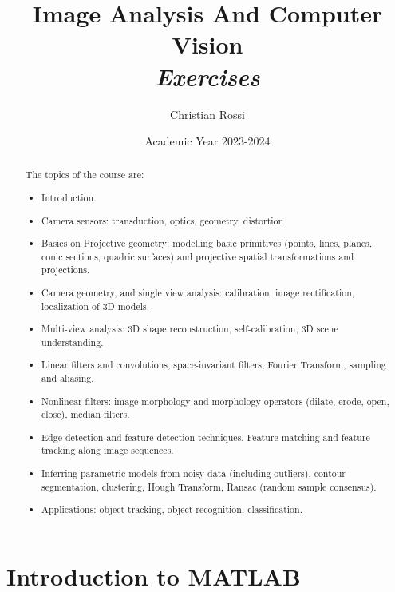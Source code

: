 \documentclass[12pt, a4paper]{report}
\title{Image Analysis And Computer Vision\\ \textit{Exercises}}
\author{Christian Rossi}
\date{Academic Year 2023-2024}
\begin{document}
\maketitle

\newpage

\begin{abstract}
    The topics of the course are: 
    \begin{itemize}
        \item Introduction.
        \item Camera sensors: transduction, optics, geometry, distortion
        \item Basics on Projective geometry: modelling basic primitives (points, lines, planes, conic sections, quadric surfaces) and projective spatial transformations and  projections.
        \item Camera geometry, and single view analysis: calibration, image rectification, localization of 3D models.
        \item Multi-view analysis: 3D shape reconstruction, self-calibration, 3D scene understanding.
        \item Linear filters and convolutions, space-invariant filters, Fourier Transform, sampling and aliasing. 
        \item Nonlinear filters: image morphology and morphology operators (dilate, erode, open, close), median filters.
        \item Edge detection and feature detection techniques. Feature matching and feature tracking along image sequences.
        \item Inferring parametric models from noisy data (including outliers), contour segmentation, clustering, Hough Transform, Ransac (random sample consensus). 
        \item Applications: object tracking, object recognition, classification.
    \end{itemize}
\end{abstract}

\newpage

\tableofcontents

\newpage

\chapter{Introduction to MATLAB}
\end{document}
